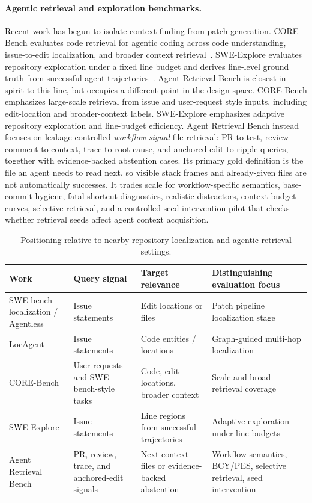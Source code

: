 \documentclass[11pt]{article}
\newcommand{\arb}{Agent Retrieval Bench}
\begin{document}
\paragraph{Agentic retrieval and exploration benchmarks.}
Recent work has begun to isolate context finding from patch generation. CORE-Bench evaluates code retrieval for agentic coding across code understanding, issue-to-edit localization, and broader context retrieval~\citep{zhang2026corebench}. SWE-Explore evaluates repository exploration under a fixed line budget and derives line-level ground truth from successful agent trajectories~\citep{zhang2026sweexplore}. \arb{} is closest in spirit to this line, but occupies a different point in the design space. CORE-Bench emphasizes large-scale retrieval from issue and user-request style inputs, including edit-location and broader-context labels. SWE-Explore emphasizes adaptive repository exploration and line-budget efficiency. \arb{} instead focuses on leakage-controlled \emph{workflow-signal} file retrieval: PR-to-test, review-comment-to-context, trace-to-root-cause, and anchored-edit-to-ripple queries, together with evidence-backed abstention cases. Its primary gold definition is the file an agent needs to read next, so visible stack frames and already-given files are not automatically successes. It trades scale for workflow-specific semantics, base-commit hygiene, fatal shortcut diagnostics, realistic distractors, context-budget curves, selective retrieval, and a controlled seed-intervention pilot that checks whether retrieval seeds affect agent context acquisition.

\begin{table}[t]
\centering
\caption{Positioning relative to nearby repository localization and agentic retrieval settings.}
\label{tab:nearby-work}
\small
\begin{tabularx}{\textwidth}{p{}p{}p{}X}
\toprule
Work & Query signal & Target relevance & Distinguishing evaluation focus \\
\midrule
SWE-bench localization / Agentless & Issue statements & Edit locations or files & Patch pipeline localization stage \\
LocAgent & Issue statements & Code entities / locations & Graph-guided multi-hop localization \\
CORE-Bench & User requests and SWE-bench-style tasks & Code, edit locations, broader context & Scale and broad retrieval coverage \\
SWE-Explore & Issue statements & Line regions from successful trajectories & Adaptive exploration under line budgets \\
\arb{} & PR, review, trace, and anchored-edit signals & Next-context files or evidence-backed abstention & Workflow semantics, BCY/PES, selective retrieval, seed intervention \\
\bottomrule
\end{tabularx}
\end{table}
\end{document}

